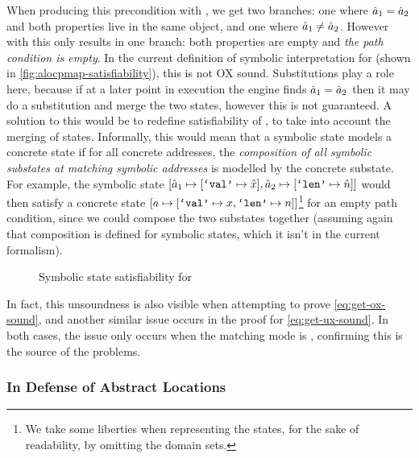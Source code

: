 When producing this precondition with \PMap, we get two branches: one where ${\hat{a}_1=\hat{a}_2}$ and both properties live in the same object, and one where ${\hat{a}_1\neq \hat{a}_2}$. However with \ALocPMap{} this only results in one branch: both properties are empty and \emph{the path condition is empty}. In the current definition of symbolic interpretation for \ALocPMap{} (shown in \autoref{fig:alocpmap-satisfiability}), this is not OX sound. Substitutions play a role here, because if at a later point in execution the engine finds $\hat{a}_1=\hat{a}_2$ then it may do a substitution and merge the two states, however this is not guaranteed. A solution to this would be to redefine satisfiability of \ALocPMap{}, to take into account the merging of states. Informally, this would mean that a symbolic state models a concrete state if for all concrete addresses, the \emph{composition of all symbolic substates at matching symbolic addresses} is modelled by the concrete substate. For example, the symbolic state $[\hat{a}_1 \mapsto [\texttt{`val'} \mapsto \hat{x}], \hat{a}_2 \mapsto [\texttt{`len'}\mapsto \hat{n}]]$ would then satisfy a concrete state $[ a \mapsto [\texttt{`val'} \mapsto x, \texttt{`len'}\mapsto n]]$\footnote{We take some liberties when representing the states, for the sake of readability, by omitting the domain sets.} for an empty path condition, since we could compose the two substates together (assuming again that composition is defined for symbolic states, which it isn't in the current formalism).

\begin{figure}
	\centering
	\begin{mathpar}
	\end{mathpar}
\caption{Symbolic state satisfiability for \ALocPMap}
\label{fig:alocpmap-satisfiability}
\end{figure}

In fact, this unsoundness is also visible when attempting to prove \ref{eq:get-ox-sound}, and another similar issue occurs in the proof for \ref{eq:get-ux-sound}. In both cases, the issue only occurs when the matching mode is , confirming this is the source of the problems.

\subsubsection{In Defense of Abstract Locations}

